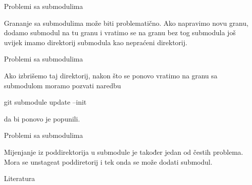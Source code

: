 \documentclass[10pt]{beamer}
\begin{document}
\begin{frame}[fragile]{Problemi sa submodulima}
    
    Grananje sa submodulima može biti problematično.
    Ako napravimo novu granu, dodamo submodul na tu granu i vratimo se na granu bez tog submodula još uvijek imamo direktorij submodula kao nepraćeni direktorij.
    
\end{frame}

\begin{frame}[fragile]{Problemi sa submodulima}
    
    Ako izbrišemo taj direktorij, nakon što se ponovo vratimo na granu sa submodulom moramo pozvati naredbu
    \begin{semiverbatim}git submodule update --init\end{semiverbatim}
    da bi ponovo je popunili.
    
\end{frame}

\begin{frame}[fragile]{Problemi sa submodulima}
    
    Mijenjanje iz poddirektorija u submodule je također jedan od čestih problema.
    Mora se unstageat poddiretorij i tek onda se može dodati submodul.
    
\end{frame}

\begin{frame}[fragile]{Literatura}
	
  	
\end{frame}
\end{document}

